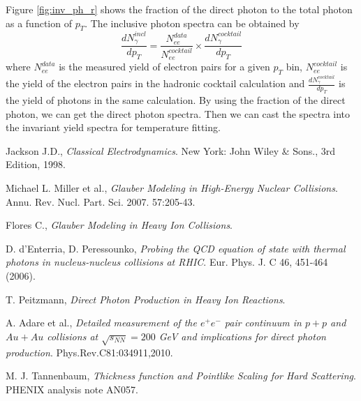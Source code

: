 \documentclass[11pt]{article} %
\begin{document}
Figure \ref{fig:inv_ph_r} shows the fraction of the direct photon to the total photon as a function of $p_T$. The inclusive photon spectra can be obtained by
\begin{equation}
\frac{dN^{incl}_{\gamma}}{dp_T}=\frac{N^{data}_{ee}}{N^{cocktail}_{ee}}\times \frac{dN^{cocktail}_{\gamma}}{dp_T}
\end{equation}
where $N^{data}_{ee}$ is the measured yield of electron pairs for a given $p_T$ bin, $N^{cocktail}_{ee}$ is the yield of the electron pairs in the hadronic cocktail calculation and $\frac{dN^{cocktail}_{\gamma}}{dp_T}$ is the yield of photons in the same calculation. By using the fraction of the direct photon, we can get the direct photon spectra. Then we can cast the spectra into the invariant yield spectra for temperature fitting.







\begin{thebibliography}{9}

  Jackson J.D.,
  \emph{Classical Electrodynamics}.
  New York: John Wiley \& Sons.,
  3rd Edition,
  1998.

  Michael L. Miller et al.,
  \emph{Glauber Modeling in High-Energy Nuclear Collisions}.
  Annu. Rev. Nucl. Part. Sci. 2007. 57:205-43.

  Flores C.,
  \emph{Glauber Modeling in Heavy Ion Collisions}.
  \href{http://nuclear.ucdavis.edu/~calderon/Presentations/Phy224C-IntroRHI-Lec7-Glauber_Talk.pdf}{}

  D. d'Enterria, D. Peressounko,
  \emph{Probing the QCD equation of state with thermal photons in nucleus-nucleus collisions at RHIC}.
  Eur. Phys. J. C 46, 451-464 (2006).

  T. Peitzmann,
  \emph{Direct Photon Production in Heavy Ion Reactions}.
	\href{http://agenda.nikhef.nl/getFile.py/access?resId=5&materialId=0&confId=536}{}

  A. Adare et al.,
  \emph{Detailed measurement of the $e^+e^-$ pair continuum in $p+p$ and $Au+Au$ collisions at $\sqrt{s_{NN}}=200$ GeV and implications for direct photon production}.
	Phys.Rev.C81:034911,2010.

	M. J. Tannenbaum,
  \emph{Thickness function and Pointlike Scaling for Hard Scattering}.
	PHENIX analysis note AN057.


\end{thebibliography}
\end{document}
